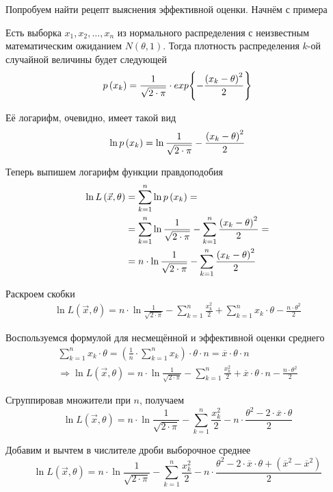 Попробуем найти рецепт выяснения эффективной оценки. Начнём с примера
\begin{example}
  Есть выборка $x_1, x_2, \dots, x_n$ из нормального распределения
  с неизвестным математическим ожиданием $N\left( \theta,1 \right)$.
  Тогда плотность распределения $k$-ой случайной величины будет следующей
  $$p\left(x_k\right)
    =\frac{1}{\sqrt{2\cdot\pi}}
      \cdot exp{\left\{-\frac{\left(x_k-\theta\right)^2}{2}\right\}}$$

  Её логарифм, очевидно, имеет такой вид
  $$\ln{p\left(x_k\right)}
    =\ln{\frac{1}{\sqrt{2\cdot\pi}}}
      -\frac{\left(x_k-\theta\right)^2}{2}$$

  Теперь выпишем логарифм функции правдоподобия
  \begin{align*}
    \ln{L\left( \vec{x},\theta \right)}
    &=\sum_{k=1}^n \ln{p\left(x_k\right)}=\\
    &=\sum_{k=1}^n \ln{\frac{1}{\sqrt{2\cdot\pi}}}
      -\sum_{k=1}^n \frac{\left(x_k-\theta\right)^2}{2}=\\
    &=n\cdot\ln{\frac{1}{\sqrt{2\cdot\pi}}}
      -\sum_{k=1}^n \frac{\left(x_k-\theta\right)^2}{2}
  \end{align*}

  Раскроем скобки
  \begin{align*}
    \ln{L\left( \vec{x},\theta \right)}
    =n\cdot\ln{\frac{1}{\sqrt{2\cdot\pi}}}
      -\sum_{k=1}^n \frac{x_k^2}{2}
      +\sum_{k=1}^n x_k\cdot\theta
      -\frac{n\cdot\theta^2}{2}
  \end{align*}

  Воспользуемся формулой для несмещённой и эффективной оценки среднего
  \begin{align*}
    \sum_{k=1}^n x_k\cdot\theta
      =\left( \frac{1}{n}\cdot\sum_{k=1}^n x_k \right) \cdot\theta\cdot n
      =\overline{x}\cdot\theta\cdot n\\
    \Rightarrow\ln{L\left( \vec{x},\theta \right)}
    =n\cdot\ln{\frac{1}{\sqrt{2\cdot\pi}}}
      -\sum_{k=1}^n \frac{x_k^2}{2}
      +\overline{x}\cdot\theta\cdot n
      -\frac{n\cdot\theta^2}{2}
  \end{align*}

  Сгруппировав множители при $n$, получаем
  $$\ln{L\left( \vec{x},\theta \right)}
    =n\cdot\ln{\frac{1}{\sqrt{2\cdot\pi}}}
      -\sum_{k=1}^n \frac{x_k^2}{2}
      -n\cdot\frac{\theta^2
        -2\cdot\overline{x}\cdot\theta}{2}$$

  Добавим и вычтем в числителе дроби выборочное среднее
  $$\ln{L\left( \vec{x},\theta \right)}
    =n\cdot\ln{\frac{1}{\sqrt{2\cdot\pi}}}
      -\sum_{k=1}^n \frac{x_k^2}{2}
      -n\cdot\frac{\theta^2
        -2\cdot\overline{x}\cdot\theta
        +\left(\overline{x}^2-\overline{x}^2\right)}{2}$$


\end{example}
